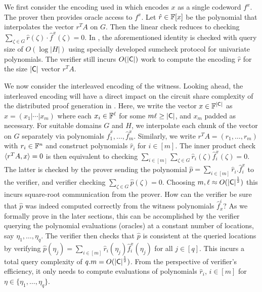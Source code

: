 	We first consider the encoding used in \cite{aurora} which encodes $x$ as a single codeword $f^x$. The prover then provides oracle access to $f^x$. Let $\hat{r}\in\mathbb{F}[x]$ be the polynomial that interpolates the vector $r^TA$ on $G$. Then the linear check reduces to checking $\sum_{\zeta\in G}\hat{r}(\zeta) \cdot \hat{f}^x(\zeta) = 0$. In \cite{aurora}, the aforementioned identity is checked with query size of $O(\log|H|)$ using specially developed sumcheck protocol for univariate polynomials. The verifier still incurs $O(\mathsf{|C|})$ work to compute the encoding $\hat{r}$ for the size $\mathsf{|C|}$ vector $r^TA$. 
	
	We now consider the interleaved encoding of the witness. Looking ahead, the interleaved encoding will have a direct impact on the circuit share complexity of the distributed proof generation in \name{}. Here, we write the vector $x\in \mathbb{F}^{\mathsf{|C|}}$ as $x=(x_1|\cdots|x_m)$ where each $x_i\in \mathbb{F}^\ell$ for some $m\ell \geq \mathsf{|C|}$, and $x_m$ padded as necessary. For suitable domains $G$ and $H$, we interpolate each chunk of the vector on $G$ 
	separately via polynomials $\hat{f}^x_1,\ldots,\hat{f}^x_m$. Similarly, we write $r^TA=(r_1,\ldots,r_m)$ with $r_i\in \mathbb{F}^n$ and construct polynomials $\hat{r}_i$	for $i\in [m]$. The inner product check $\langle r^TA,x\rangle=0$ is then equivalent to checking $\sum_{i\in [m]}\sum_{\zeta\in G}\hat{r}_i(\zeta)\hat{f}^x_i(\zeta)=0$. The	latter is checked by the prover sending the polynomial $\hat{p}=\sum_{i\in
	[m]}\hat{r}_i.\hat{f}^x_i$ to the verifier, and verifier checking $\sum_{\zeta\in G}\hat{p}(\zeta)=0$. Choosing $m,\ell\approx O(\mathsf{|C|}^\frac{1}{2})$ this incurs square-root communication from the prover. How can the verifier be sure that $\hat{p}$ was indeed computed correctly from the witness polynomials $\hat{f}^i_x$? As we formally prove in the later sections, this can be accomplished by the verifier querying the polynomial evaluations (oracles) at a constant number of locations, say $\eta_1,\ldots,\eta_q$. The verifier then checks
	that $\hat{p}$ is consistent at the queried locations by verifying $\hat{p}(\eta_j)=\sum_{i\in [m]}\hat{r}_i(\eta_j)\hat{f}^x_i(\eta_j)$ for
	all $j\in [q]$. This incurs a total query complexity of $q.m=O(\mathsf{|C|}^\frac{1}{2})$.	
	From the perspective of verifier's efficiency, it only needs to compute evaluations of polynomials $\hat{r}_i$, $i\in [m]$ for $\eta\in \{\eta_1,\ldots,\eta_q\}$. %


